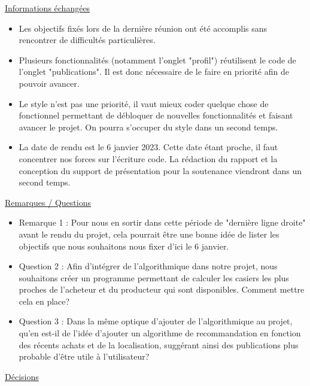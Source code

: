 \documentclass[11pt]{article}
\begin{document}
\vspace{0.5cm}

\underline{Informations échangées}
\vspace{0.2cm}

\begin{itemize}
    \item   Les objectifs fixés lors de la dernière réunion ont été accomplis sans rencontrer de difficultés particulières.
	\item 	Plusieurs fonctionnalités (notamment l'onglet "profil") réutilisent le code de l'onglet "publications". Il est donc nécessaire de le faire en priorité afin de pouvoir avancer. 
	\item 	Le style n'est pas une priorité, il vaut mieux coder quelque chose de fonctionnel permettant de débloquer de nouvelles fonctionnalités et faisant avancer le projet. On pourra s'occuper du style dans un second temps.
    \item   La date de rendu est le 6 janvier 2023. Cette date étant proche, il faut concentrer nos forces sur l'écriture code. La rédaction du rapport et la conception du support de présentation pour la soutenance viendront dans un second temps.
\end{itemize}

\vspace{0.5cm}

\underline{Remarques / Questions}
\vspace{0.2cm}

\begin{itemize}
	\item Remarque 1 : Pour nous en sortir dans cette période de "dernière ligne droite" avant le rendu du projet, cela pourrait être une bonne idée de lister les objectifs que nous souhaitons nous fixer d'ici le 6 janvier.
	\item Question 2 : Afin d'intégrer de l'algorithmique dans notre projet, nous souhaitons créer un programme permettant de calculer les casiers les plus proches de l'acheteur et du producteur qui sont disponibles. Comment mettre cela en place?
	\item Question 3 : Dans la même optique d'ajouter de l'algorithmique au projet, qu'en est-il de l'idée d'ajouter un algorithme de recommandation en fonction des récents achats et de la localisation, suggérant ainsi des publications plus probable d'être utile à l'utilisateur?

\end{itemize}

\vspace{0.5cm}
\newpage       %
\underline{Décisions} 
\vspace{0.2cm}
\end{document}
